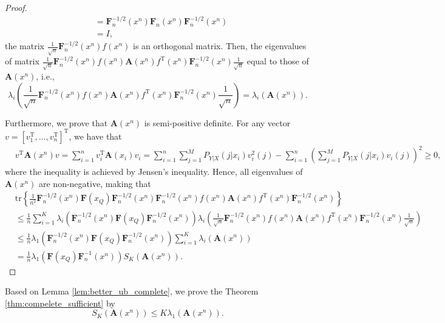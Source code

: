 \documentclass{article} %
\theoremstyle{plain} %
\begin{document}
\begin{proof}
\begin{align*}
& = \mathbf{F}_n^{-1/2}(x^n)\mathbf{F}_n(x^n)\mathbf{F}_n^{-1/2}(x^n)\\
& = I,
\end{align*}
the matrix $\frac1{\sqrt{n}}\mathbf{F}_n^{-1/2}(x^n) f(x^n)$ is an orthogonal matrix. Then, the eigenvalues of matrix $\frac1{\sqrt{n}}\mathbf{F}_n^{-1/2}(x^n) f(x^n){\mathbf{A}}(x^n) f^\mathrm{T}(x^n)\mathbf{F}_n^{-1/2}(x^n)\frac1{\sqrt{n}}$ equal to those of $\mathbf{A}(x^n)$, i.e.,
\begin{equation*}
\lambda_i\left(\frac1{\sqrt{n}}\mathbf{F}_n^{-1/2}(x^n) f(x^n){\mathbf{A}}(x^n) f^\mathrm{T}(x^n)\mathbf{F}_n^{-1/2}(x^n)\frac1{\sqrt{n}}\right) = \lambda_i\left(\mathbf{A}(x^n)\right).
\end{equation*}

Furthermore, we prove that $\mathbf{A}(x^n)$ is semi-positive definite.
For any vector $v=[v_1^\mathrm{T},\dots,v_n^\mathrm{T}]^\mathrm{T}$, we have that
\begin{align*}
& v^\mathrm{T}\mathbf{A}(x^n)v = \sum_{i=1}^n v_i^\mathrm{T} \mathbf{A}(x_i)v_i = \sum_{i=1}^n\sum_{j=1}^M P_{Y|X}(j|x_i)v^2_i(j) - \sum_{i=1}^n\left(\sum_{j=1}^M P_{Y|X}(j|x_i) v_i(j)\right)^2 \geq 0,
\end{align*}
where the inequality is achieved by Jensen's inequality.
Hence, all eigenvalues of $\mathbf{A}(x^n)$ are non-negative, making that
\begin{align*}
& \mathrm{tr}\left\{ \frac1{n^2}\mathbf{F}_n^{-1/2}(x^n)\mathbf{F}(x_Q)\mathbf{F}_n^{-1/2}(x^n) \mathbf{F}_n^{-1/2}(x^n) f(x^n){\mathbf{A}}(x^n) f^\mathrm{T}(x^n)\mathbf{F}_n^{-1/2}(x^n) \right\}\\
& \leq \frac1n \sum_{i=1}^K \lambda_i\left(\mathbf{F}_n^{-1/2}(x^n)\mathbf{F}(x_Q)\mathbf{F}_n^{-1/2}(x^n)\right) \lambda_i\left(\frac1{\sqrt{n}}\mathbf{F}_n^{-1/2}(x^n) f(x^n){\mathbf{A}}(x^n) f^\mathrm{T}(x^n)\mathbf{F}_n^{-1/2}(x^n)\frac1{\sqrt{n}}\right)\\
& \leq \frac1n \lambda_1\left(\mathbf{F}_n^{-1/2}(x^n)\mathbf{F}(x_Q)\mathbf{F}_n^{-1/2}(x^n)\right) \sum_{i=1}^K \lambda_i\left(\mathbf{A}(x^n)\right)\\
& = \frac1n \lambda_1\left(\mathbf{F}(x_Q)\mathbf{F}_n^{-1}(x^n) \right) S_K({\textbf{A}}(x^n)).
\end{align*}
\end{proof}

Based on Lemma \ref{lem:better_ub_complete}, we prove the Theorem \ref{thm:compelete_sufficient} by 
\begin{equation*}
    S_K({\textbf{A}}(x^n)) \leq K \lambda_1(\textbf{A}(x^n)).
\end{equation*}
\end{document}
